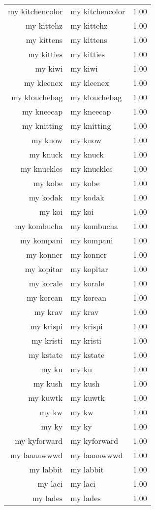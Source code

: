 \begin{table}[ht]
\begin{tabular}{rlr}
  my kitchencolor & my kitchencolor & 1.00 \\ 
  my kittehz & my kittehz & 1.00 \\ 
  my kittens & my kittens & 1.00 \\ 
  my kitties & my kitties & 1.00 \\ 
  my kiwi & my kiwi & 1.00 \\ 
  my kleenex & my kleenex & 1.00 \\ 
  my klouchebag & my klouchebag & 1.00 \\ 
  my kneecap & my kneecap & 1.00 \\ 
  my knitting & my knitting & 1.00 \\ 
  my know & my know & 1.00 \\ 
  my knuck & my knuck & 1.00 \\ 
  my knuckles & my knuckles & 1.00 \\ 
  my kobe & my kobe & 1.00 \\ 
  my kodak & my kodak & 1.00 \\ 
  my koi & my koi & 1.00 \\ 
  my kombucha & my kombucha & 1.00 \\ 
  my kompani & my kompani & 1.00 \\ 
  my konner & my konner & 1.00 \\ 
  my kopitar & my kopitar & 1.00 \\ 
  my korale & my korale & 1.00 \\ 
  my korean & my korean & 1.00 \\ 
  my krav & my krav & 1.00 \\ 
  my krispi & my krispi & 1.00 \\ 
  my kristi & my kristi & 1.00 \\ 
  my kstate & my kstate & 1.00 \\ 
  my ku & my ku & 1.00 \\ 
  my kush & my kush & 1.00 \\ 
  my kuwtk & my kuwtk & 1.00 \\ 
  my kw & my kw & 1.00 \\ 
  my ky & my ky & 1.00 \\ 
  my kyforward & my kyforward & 1.00 \\ 
  my laaaawwwd & my laaaawwwd & 1.00 \\ 
  my labbit & my labbit & 1.00 \\ 
  my laci & my laci & 1.00 \\ 
  my lades & my lades & 1.00 \\ 

\end{tabular}
\end{table}
